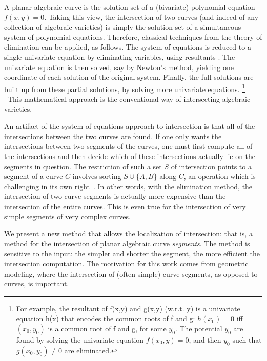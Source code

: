 A planar algebraic curve is the solution set of a (bivariate) polynomial
equation $f(x,y) = 0$.
Taking this view, the intersection of two curves 
(and indeed of any collection of algebraic varieties) is simply the
solution set of a simultaneous system of polynomial equations.
Therefore, classical techniques from the theory of elimination can be applied,
as follows.
The system of equations is reduced to a single univariate equation by
eliminating variables, using resultants \cite{walker,canny}.
The univariate equation is then solved, say by Newton's method, yielding
one coordinate of each solution of the original system.
Finally, the full solutions are built up from these partial solutions,
by solving more univariate equations.
\ifFull\footnote{For example, the 
	resultant \cite{walker} of f(x,y) and g(x,y) (w.r.t. y) 
	is a univariate equation h(x) that encodes the common roots of f and g:
	$h(x_{0})=0$ iff $(x_{0},y_{0})$ is a common root of f and g, for 
	some $y_{0}$.  The potential $y_{0}$ are found by solving the
	univariate equation $f(x_{0},y)=0$, and then $y_{0}$ such that
	$g(x_{0},y_{0}) \neq 0$ are eliminated.}\fi
\ This mathematical approach is the conventional way of 
intersecting algebraic varieties.

An artifact of the system-of-equations approach to intersection 
is that all of the intersections between the two curves are found.
If one only wants the intersections between two segments of the curves,
one must first compute all of the intersections and then decide which
of these intersections actually lie on the segments in question.
The restriction of such a set $S$ of intersection
points to a segment  of a curve $C$ 
involves sorting $S \cup \{A,B\}$ along $C$,
an operation which is challenging in its own right~\cite{johnstone87}.
In other words, with the elimination method, the intersection of two
curve segments is actually more expensive than the intersection of the entire 
curves.
This is even true for the intersection of very simple segments of very
complex curves.

We present a new method that allows the localization of intersection: 
that is, a method for the intersection of planar algebraic curve {\em segments}.
The method is sensitive to the input: the simpler and shorter the segment, 
the more efficient the intersection computation.
The motivation for this work comes from geometric modeling, where
the intersection of (often simple) curve segments, as opposed to curves, is
important.

